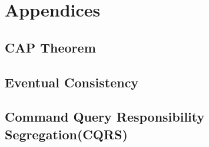 \chapter{Appendices}\label{chapter:appendices}

\section{CAP Theorem}\label{section:appendices/CAP_theorem}
\section{Eventual Consistency}\label{section:appendices/eventual_consistency}
\section{Command Query Responsibility Segregation(CQRS)}\label{section:appendices/CQRS}
